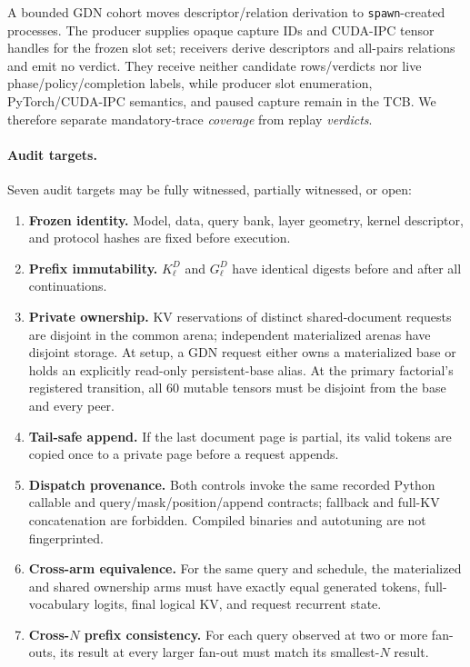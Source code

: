 \documentclass{article}
\begin{document}
A bounded GDN cohort moves descriptor/relation derivation to
\texttt{spawn}-created processes.  The producer supplies opaque capture IDs and
CUDA-IPC tensor handles for the frozen slot set; receivers derive descriptors
and all-pairs relations and emit no verdict.  They receive neither candidate
rows/verdicts nor live phase/policy/completion labels, while producer slot
enumeration, PyTorch/CUDA-IPC semantics, and paused capture remain in the TCB.
We therefore separate mandatory-trace \emph{coverage} from replay
\emph{verdicts}.

\paragraph{Audit targets.}

Seven audit targets may be fully witnessed, partially witnessed, or open:
\FloatBarrier
\begin{enumerate}
  \setlength{\itemsep}{1pt}
  \setlength{\parskip}{0pt}
  \item \textbf{Frozen identity.}  Model, data, query bank, layer geometry,
  kernel descriptor, and protocol hashes are fixed before execution.
  \item \textbf{Prefix immutability.}  $K^D_\ell$ and $G^D_\ell$ have identical
  digests before and after all continuations.
  \item \textbf{Private ownership.}  KV reservations of distinct
  shared-document requests are disjoint in the common arena; independent
  materialized arenas have disjoint storage.  At setup, a GDN request either
  owns a materialized base or holds an explicitly read-only persistent-base
  alias.  At the primary factorial's registered transition, all 60 mutable tensors must be
  disjoint from the base and every peer.
  \item \textbf{Tail-safe append.}  If the last document page is partial, its
  valid tokens are copied once to a private page before a request appends.
  \item \textbf{Dispatch provenance.}  Both controls invoke the same recorded
  Python callable and query/mask/position/append contracts; fallback and
  full-KV concatenation are forbidden.  Compiled binaries and autotuning are
  not fingerprinted.
  \item \textbf{Cross-arm equivalence.}  For the same query and schedule, the
  materialized and shared ownership arms must have exactly equal generated
  tokens, full-vocabulary logits, final logical KV, and request recurrent
  state.
  \item \textbf{Cross-$N$ prefix consistency.}  For each query observed at two or more
  fan-outs, its result at every larger fan-out must match its smallest-$N$
  result.
\end{enumerate}
\end{document}
